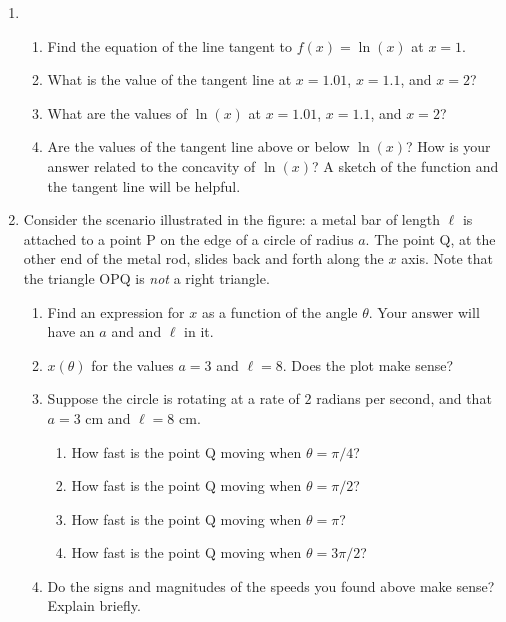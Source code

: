 \documentclass[12pt]{article}
\begin{document}
\begin{enumerate}
\setlength{\itemsep}{33mm}

\item 
  \begin{enumerate}
    \setlength{\itemsep}{8mm}
  \item Find the equation of the line tangent to $f(x) = \ln(x)$ at
    $x=1$.
  \item What is the value of the tangent line at $x=1.01$, $x=1.1$,
    and $x=2$?
  \item What are the values of $\ln(x)$ at $x=1.01$, $x=1.1$,
    and $x=2$?
  \item Are the values of the tangent line above or below $\ln(x)$?
    How is your answer related to the concavity of $\ln(x)$? A sketch
    of the function and the tangent line will be helpful. 
  \end{enumerate}

\newpage
  
\item Consider the scenario illustrated in the figure: a metal bar of
  length $\ell$ is attached to a point P on the edge of a circle of
  radius $a$. The point Q, at the other end of the metal rod, slides
  back and forth along the $x$ axis.  Note that the triangle OPQ is
  \emph{not} a right triangle.
  \begin{enumerate}
    \setlength{\itemsep}{10mm}
  \item Find an expression for $x$ as a function of the angle
    $\theta$. Your answer will have an $a$ and and $\ell$ in it.
  \item $x(\theta)$ for the values $a=3$ and $\ell = 8$. Does the
    plot make sense?
    \item Suppose the circle is rotating at a rate of $2$ radians per
      second, and that $a = 3$ cm and $\ell = 8$ cm.
      \begin{enumerate}
        \setlength{\itemsep}{5mm}
      \item How fast is the point Q moving when $\theta = \pi/4$?
      \item How fast is the point Q moving when $\theta = \pi/2$?
      \item How fast is the point Q moving when $\theta = \pi$?
      \item How fast is the point Q moving when $\theta = 3\pi/2$?
      \end{enumerate}
     \item Do the signs and magnitudes of the speeds you found above
       make sense? Explain briefly. 
  \end{enumerate}


\end{enumerate}
\end{document}
